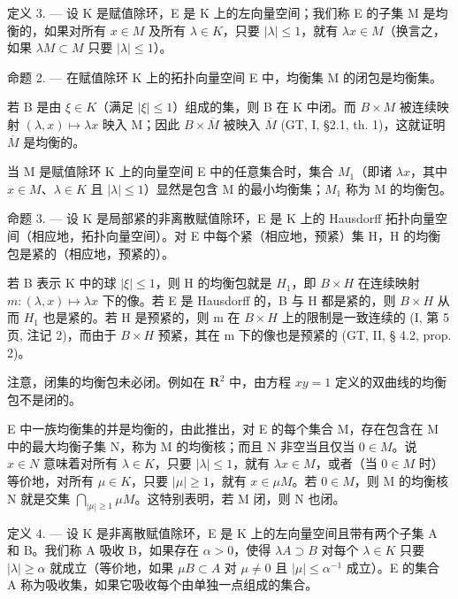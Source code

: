 定义 3. --- 设 K 是赋值除环，E 是 K 上的左向量空间；我们称 E 的子集 M 是均衡的，如果对所有 \(x \in M\) 及所有 \(\lambda \in K\)，只要 \(|\lambda| \leqslant 1\)，就有 \(\lambda x \in M\)（换言之，如果 \(\lambda M \subset M\) 只要 \(|\lambda| \leqslant 1\)）。

命题 2. --- 在赋值除环 K 上的拓扑向量空间 E 中，均衡集 M 的闭包是均衡集。

若 B 是由 \(\xi\in K\)（满足 \(|\xi|\leqslant1\)）组成的集，则 B 在 K 中闭。而 \(B\times M\) 被连续映射 \((\lambda,x)\mapsto\lambda x\) 映入 M；因此 \(B\times\overline{M}\) 被映入 \(\overline{M}\) (GT, I, §2.1, th. 1)，这就证明 \(\overline{M}\) 是均衡的。

当 M 是赋值除环 K 上的向量空间 E 中的任意集合时，集合 \(M_{1}\)（即诸 \(\lambda x\)，其中 \(x \in M\)、\(\lambda \in K\) 且 \(|\lambda| \leqslant 1\)）显然是包含 M 的最小均衡集；\(M_{1}\) 称为 M 的均衡包。

命题 3. --- 设 K 是局部紧的非离散赋值除环，E 是 K 上的 Hausdorff 拓扑向量空间（相应地，拓扑向量空间）。对 E 中每个紧（相应地，预紧）集 H，H 的均衡包是紧的（相应地，预紧的）。

若 B 表示 K 中的球 \(|\xi| \leqslant 1\)，则 H 的均衡包就是 \(H_{1}\)，即 \(B \times H\) 在连续映射 \(m: (\lambda, x) \mapsto \lambda x\) 下的像。若 E 是 Hausdorff 的，B 与 H 都是紧的，则 \(B \times H\) 从而 \(H_{1}\) 也是紧的。若 H 是预紧的，则 m 在 \(B \times H\) 上的限制是一致连续的 (I, 第 5 页, 注记 2)，而由于 \(B \times H\) 预紧，其在 m 下的像也是预紧的 (GT, II, § 4.2, prop. 2)。

注意，闭集的均衡包未必闭。例如在 \(\mathbf{R}^2\) 中，由方程 \(xy = 1\) 定义的双曲线的均衡包不是闭的。

E 中一族均衡集的并是均衡的，由此推出，对 E 的每个集合 M，存在包含在 M 中的最大均衡子集 N，称为 M 的均衡核；而且 N 非空当且仅当 \(0 \in M\)。说 \(x \in N\) 意味着对所有 \(\lambda \in K\)，只要 \(|\lambda| \leqslant 1\)，就有 \(\lambda x \in M\)，或者（当 \(0 \in M\) 时）等价地，对所有 \(\mu \in K\)，只要 \(|\mu| \geqslant 1\)，就有 \(x \in \mu M\)。若 \(0 \in M\)，则 M 的均衡核 N 就是交集 \(\bigcap_{|\mu| \geqslant 1} \mu M\)。这特别表明，若 M 闭，则 N 也闭。

定义 4. --- 设 K 是非离散赋值除环，E 是 K 上的左向量空间且带有两个子集 A 和 B。我们称 A 吸收 B，如果存在 \(\alpha > 0\)，使得 \(\lambda A \supset B\) 对每个 \(\lambda \in K\) 只要 \(|\lambda| \geqslant \alpha\) 就成立（等价地，如果 \(\mu B \subset A\) 对 \(\mu \neq 0\) 且 \(|\mu| \leqslant \alpha^{-1}\) 成立）。E 的集合 A 称为吸收集，如果它吸收每个由单独一点组成的集合。

